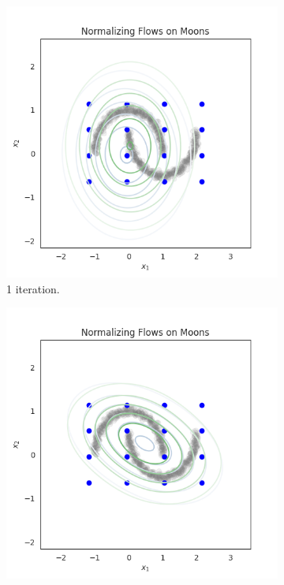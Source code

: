 \documentclass[shortabstract]{iithesis}
\begin{document}
\begin{figure}
    \centering
    \begin{subfigure}{0.32\textwidth}
    \includegraphics[scale=0.35]{flow_on_moons_0_penalty=0_grid.png}
    \caption{ 1 iteration.}
    \end{subfigure}
    \begin{subfigure}{0.32\textwidth}
    \includegraphics[scale=0.35]{flow_on_moons_1_penalty=0_grid.png}

\end{subfigure}
\end{figure}
\end{document}
